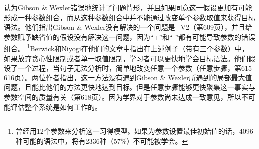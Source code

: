  \citet{BN96a}认为Gibson \& Wexler错误地统计了问题情形，并且如果同意这一假设更加有可能形成一种参数组合，而从这种参数组合中并不能通过改变单个参数取值来获得目标语法。他们指出Gibson \& Wexler没有解决的一个问题是$-$V2（第609页），并且给参数赋予缺省值的假设没有解决这一问题，因为“+”和“-”都有可能导致参数的错误组合。 \footnote{%
   \citet{Kohl99a,Kohl2000a}曾经用12个参数来分析这一习得模型。如果为参数设置最佳初始值的话，4096种可能的语法中，将有2336种（57\%）不可能被学会。
}Berwick和Niyogi在他们的文章中指出在上述例子（带有三个参数）中，如果放弃贪心性限制或者单一取值限制，学习者可以更快地学会目标语法。他们假设了一个过程，当句子无法分析时，简单地改变任意一个参数（任意步骤，第615--616页）。两位作者指出，这一方法没有遇到Gibson \& Wexler所遇到的局部最大值问题，且能比他们的方法更快地达到目标。但是任意步骤能够更快聚集这一事实与参数空间的质量有关（第618页）。因为学界对于参数尚未达成一致意见，所以不可能评估整个系统是如何工作的。

